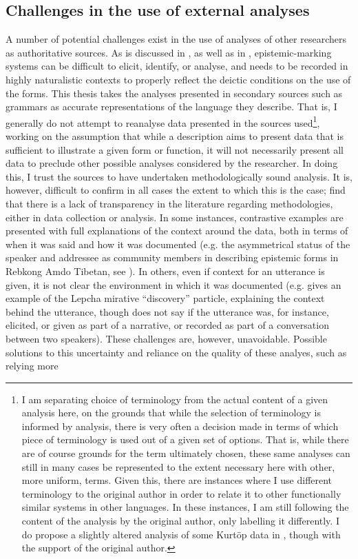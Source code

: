 \subsection{Challenges in the use of external analyses}\label{ss:Methods:Challenges}
A number of potential challenges exist in the use of analyses of other researchers as authoritative sources. As is discussed in , as well as in , epistemic-marking systems can be difficult to elicit, identify, or analyse, and needs to be recorded in highly naturalistic contexts to properly reflect the deictic conditions on the use of the forms. This thesis takes the analyses presented in secondary sources such as grammars as accurate representations of the language they describe. That is, I generally do not attempt to reanalyse data presented in the sources used\footnote{I am separating choice of terminology from the actual content of a given analysis here, on the grounds that while the selection of terminology is informed by analysis, there is very often a decision made in terms of which piece of terminology is used out of a given set of options. That is, while there are of course grounds for the term ultimately chosen, these same analyses can still in many cases be represented to the extent necessary here with other, more uniform, terms. Given this, there are instances where I use different terminology to the original author in order to relate it to other functionally similar systems in other languages. In these instances, I am still following the content of the analysis by the original author, only labelling it differently. I do propose a slightly altered analysis of some Kurtöp data in , though with the support of the original author.}, working on the assumption that while a description aims to present data that is sufficient to illustrate a given form or function, it will not necessarily present all data to preclude other possible analyses considered by the researcher. In doing this, I trust the sources to have undertaken methodologically sound analysis. It is, however, difficult to confirm in all cases the extent to which this is the case;  find that there is a lack of transparency in the literature regarding methodologies, either in data collection or analysis. In some instances, contrastive examples are presented with full explanations of the context around the data, both in terms of when it was said and how it was documented (e.g. the asymmetrical status of the speaker and addressee as community members in \cite[300]{Simon2021} describing epistemic forms in Rebkong Amdo Tibetan, see ). In others, even if context for an utterance is given, it is not clear the environment in which it was documented (e.g.  gives an example of the Lepcha mirative ``discovery'' particle, explaining the context behind the utterance, though does not say if the utterance was, for instance, elicited, or given as part of a narrative, or recorded as part of a conversation between two speakers). These challenges are, however, unavoidable. Possible solutions to this uncertainty and reliance on the quality of these analyes, such as relying more 